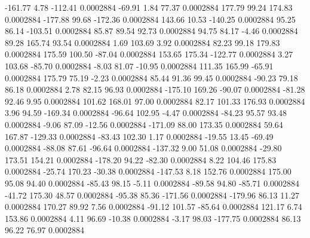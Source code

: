      -161.77        4.78     -112.41     0.0002884
      -69.91        1.84       77.37     0.0002884
      177.79       99.24      174.83     0.0002884
     -177.88       99.68     -172.36     0.0002884
      143.66       10.53     -140.25     0.0002884
       95.25       86.14     -103.51     0.0002884
       85.87       89.54       92.73     0.0002884
       94.75       84.17       -4.46     0.0002884
       89.28      165.74       93.54     0.0002884
        1.69      103.69        3.92     0.0002884
       82.23       99.18      179.83     0.0002884
      175.59      100.50      -87.04     0.0002884
      153.65      175.34     -122.77     0.0002884
        3.27      103.68      -85.70     0.0002884
       -8.03       81.07      -10.95     0.0002884
      111.35      165.99      -65.91     0.0002884
      175.79       75.19       -2.23     0.0002884
       85.44       91.36       99.45     0.0002884
      -90.23       79.18       86.18     0.0002884
        2.78       82.15       96.93     0.0002884
     -175.10      169.26      -90.07     0.0002884
      -81.28       92.46        9.95     0.0002884
      101.62      168.01       97.00     0.0002884
       82.17      101.33      176.93     0.0002884
        3.96       94.59     -169.34     0.0002884
      -96.64      102.95       -4.47     0.0002884
      -84.23       95.57       93.48     0.0002884
       -9.06       87.09      -12.56     0.0002884
     -171.09       88.00      173.35     0.0002884
       59.64      167.87     -129.33     0.0002884
      -83.43      102.30        1.17     0.0002884
      -19.55       13.45      -69.49     0.0002884
      -88.08       87.61      -96.64     0.0002884
     -137.32        9.00       51.08     0.0002884
      -29.80      173.51      154.21     0.0002884
     -178.20       94.22      -82.30     0.0002884
        8.22      104.46      175.83     0.0002884
      -25.74      170.23      -30.38     0.0002884
     -147.53        8.18      152.76     0.0002884
      175.00       95.08       94.40     0.0002884
      -85.43       98.15       -5.11     0.0002884
      -89.58       94.80      -85.71     0.0002884
      -41.72      175.30       48.57     0.0002884
      -95.38       85.36     -171.56     0.0002884
     -179.96       86.13       11.27     0.0002884
      170.27       89.92        7.56     0.0002884
      -91.12      101.57      -85.64     0.0002884
      121.17        6.74      153.86     0.0002884
        4.11       96.69      -10.38     0.0002884
       -3.17       98.03     -177.75     0.0002884
       86.13       96.22       76.97     0.0002884
